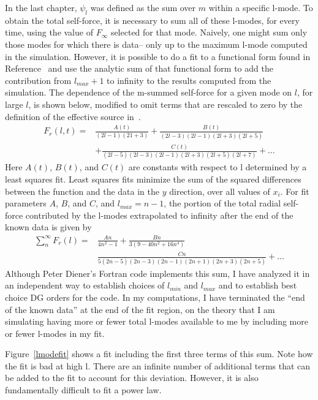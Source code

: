 In the last chapter, $\psi_l$ was defined as the sum over $m$ within a specific l-mode. To obtain the total self-force, it is necessary to sum all of these l-modes, for every time, using the value of $F_{\infty}$ selected for that mode. Naively, one might sum only those modes for which there is data-- only up to the maximum l-mode computed in the simulation. However, it is possible to do a fit to a functional form found in Reference~\cite{heffernan_ottewil_wardell_modesum_basisForCode} and use the analytic sum of that functional form to add the contribution from $l_{max}+1$ to infinity to the results computed from the simulation. The dependence of the m-summed self-force for a given mode on $l$, for large $l$, is shown below, modified to omit terms that are rescaled to zero by the definition of the effective source in~\cite{wardell_vega_thornburg_diener}.
\begin{eqnarray}
  F_r(l,t)=&\frac{A(t)}{(2l-1)(21+3)}+\frac{B(t)}{(2l-3)(2l-1)(2l+3)(2l+5)}\nonumber \\
  &+\frac{C(t)}{(2l-5)(2l-3)(2l-1)(2l+3)(2l+5)(2l+7)}+\ldots
  \label{lmodefitsum}
\end{eqnarray}
Here $A(t)$, $B(t)$, and $C(t)$ are constants with respect to l determined by a least squares fit. Least squares fits minimize the sum of the squared differences between the function and the data in the $y$ direction, over all values of $x_i$. For fit parameters $A$, $B$, and $C$, and $l_{max}=n-1$, the portion of the total radial self-force contributed by the l-modes extrapolated to infinity after the end of the known data is given by
\begin{eqnarray}
  \sum_n^{\infty} F_r(l) = &\frac{An}{4n^2-1}+\frac{Bn}{3(9-40n^2+16n^4)}\nonumber\\
  &\frac{Cn}{5(2n-5)(2n-3)(2n-1)(2n+1)(2n+3)(2n+5)}+\ldots
\end{eqnarray}
Although Peter Diener's Fortran code implements this sum, I have analyzed it in an independent way to establish choices of $l_{min}$ and $l_{max}$ and to establish best choice DG orders for the code. In my computations, I have terminated the ``end of the known data'' at the end of the fit region, on the theory that I am simulating having more or fewer total l-modes available to me by including more or fewer l-modes in my fit.

Figure~\ref{lmodefit} shows a fit including the first three terms of this sum. Note how the fit is bad at high l. There are an infinite number of additional terms that can be added to the fit to account for this deviation. However, it is also fundamentally difficult to fit a power law.


